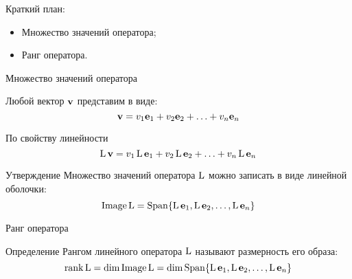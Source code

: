 
\begin{frame} %


\end{frame}



\begin{frame}{Краткий план:}
  \begin{itemize}[<+->]
    \item Множество значений оператора;
    \item Ранг оператора.
  \end{itemize}

\end{frame}


\begin{frame}{Множество значений оператора}

Любой вектор $\mathbf{v}$ представим в виде:
\[
\mathbf{v} = v_1 \mathbf{e}_1 + v_2 \mathbf{e}_2 + \ldots + v_n \mathbf{e}_n
\]

\pause
По свойству линейности
\[
\operatorname{L} \mathbf{v} = v_1 \operatorname{L}\mathbf{e}_1 + v_2 \operatorname{L}\mathbf{e}_2 + \ldots + v_n\operatorname{L}\mathbf{e}_n
\]

\pause
\begin{block}{Утверждение}
Множество значений оператора $\operatorname{L}$ можно записать в виде линейной оболочки:
\[
\operatorname{Image} \operatorname{L}  = \operatorname{Span} \{ \operatorname{L} \mathbf{e}_1, \operatorname{L} \mathbf{e}_2, \ldots, \operatorname{L} \mathbf{e}_n  \}  
\]
\end{block}

\end{frame}



\begin{frame}{Ранг оператора}
\begin{block}{Определение}
    \alert{Рангом} линейного оператора $\operatorname{L}$ называют размерность его образа:
    \[
      \rank \operatorname{L} = \dim \operatorname{Image} \operatorname{L} = \dim \operatorname{Span} \{ \operatorname{L}\mathbf{e}_1, \operatorname{L}\mathbf{e}_2, \ldots, \operatorname{L}\mathbf{e}_n\}  
    \]
\end{block}
\end{frame}

